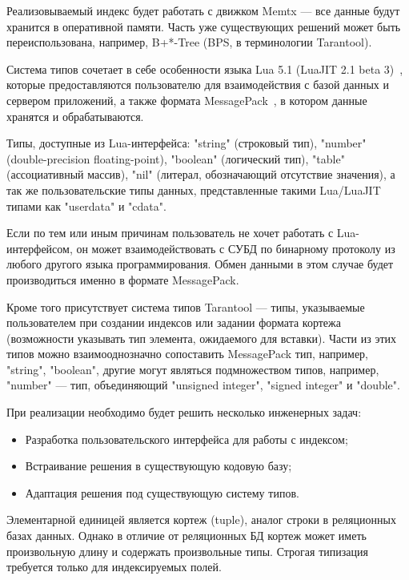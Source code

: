 Реализовываемый индекс будет работать с движком Memtx ---
все данные будут хранится в оперативной памяти.
Часть уже существующих решений может быть переиспользована, например,
B+*-Tree (BPS, в терминологии Tarantool).

Система типов сочетает в себе особенности
языка Lua 5.1 (LuaJIT 2.1 beta 3)~\cite{ierusalimschy2006lua, pall2008luajit},
которые предоставляются пользователю для взаимодействия
с базой данных и сервером приложений,
а также
формата MessagePack~\cite{messagepack_site},
в котором данные хранятся и обрабатываются.

Типы, доступные из Lua-интерфейса:
"string" (строковый тип), "number" (double-precision floating-point),
"boolean" (логический тип),
"table" (ассоциативный массив),
"nil" (литерал, обозначающий отсутствие значения),
а так же пользовательские типы данных,
представленные такими Lua/LuaJIT типами как "userdata" и "cdata".

Если по тем или иным причинам пользователь
не хочет работать с Lua-интерфейсом,
он может взаимодействовать с СУБД по бинарному протоколу
из любого другого языка программирования.
Обмен данными в этом случае будет производиться именно в формате MessagePack.

Кроме того присутствует система типов Tarantool ---
типы,
указываемые пользователем при создании индексов или задании формата кортежа
(возможности указывать тип элемента, ожидаемого для вставки).
Части из этих типов можно взаимооднозначно сопоставить
MessagePack тип, например, "string", "boolean",
другие могут являться подмножеством типов, например,
"number" --- тип, объединяющий "unsigned integer", "signed integer" и "double".

При реализации необходимо будет решить несколько инженерных задач:
\begin{itemize}
	\item Разработка пользовательского интерфейса для работы с индексом;
	\item Встраивание решения в существующую кодовую базу;
	\item Адаптация решения под существующую систему типов.
\end{itemize}

Элементарной единицей является кортеж (tuple), аналог строки в
реляционных базах данных. Однако в отличие от реляционных БД
кортеж может иметь произвольную длину и содержать произвольные типы.
Строгая типизация требуется только для индексируемых полей.
